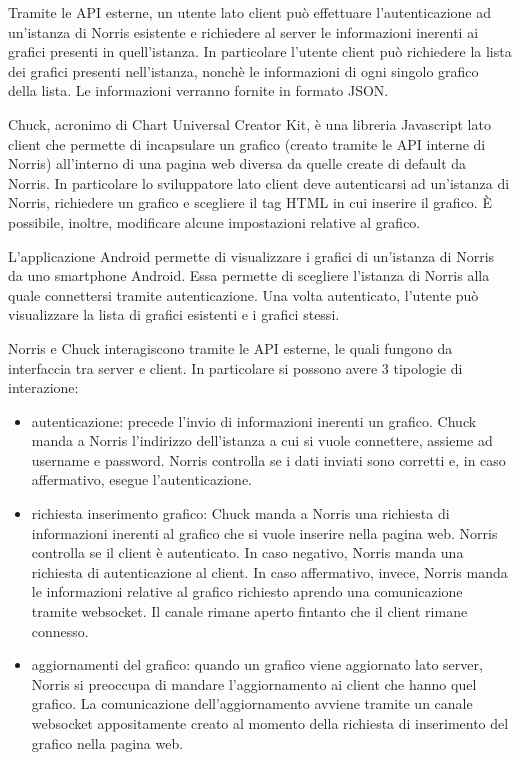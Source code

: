    Tramite le API esterne, un utente lato client può effettuare l'autenticazione ad un'istanza di Norris esistente e richiedere al server le informazioni inerenti ai grafici presenti in quell'istanza. In particolare l'utente client può richiedere la lista dei grafici presenti nell'istanza, nonchè le informazioni di ogni singolo grafico della lista. Le informazioni verranno fornite in formato JSON.

    Chuck, acronimo di Chart Universal Creator Kit, è una libreria Javascript lato client che permette di incapsulare un grafico (creato tramite le API interne di Norris) all'interno di una pagina web diversa da quelle create di default da Norris. In particolare lo sviluppatore lato client deve autenticarsi ad un'istanza di Norris, richiedere un grafico e scegliere il tag HTML in cui inserire il grafico. È possibile, inoltre, modificare alcune impostazioni relative al grafico.
    
    L'applicazione Android permette di visualizzare i grafici di un'istanza di Norris da uno smartphone Android. Essa permette di scegliere l'istanza di Norris alla quale connettersi tramite autenticazione. Una volta autenticato, l'utente può visualizzare la lista di grafici esistenti e i grafici stessi.
        
    Norris e Chuck interagiscono tramite le API esterne, le quali fungono da interfaccia tra server e client. In particolare si possono avere 3 tipologie di interazione:
    \begin{itemize}
        \item autenticazione: precede l'invio di informazioni inerenti un grafico. Chuck manda a Norris l'indirizzo dell'istanza a cui si vuole connettere, assieme ad username e password. Norris controlla se i dati inviati sono corretti e, in caso affermativo, esegue l'autenticazione.
        \item richiesta inserimento grafico: Chuck manda a Norris una richiesta di informazioni inerenti al grafico che si vuole inserire nella pagina web. Norris controlla se il client è autenticato. In caso negativo, Norris manda una richiesta di autenticazione al client. In caso affermativo, invece, Norris manda le informazioni relative al grafico richiesto aprendo una comunicazione tramite websocket. Il canale rimane aperto fintanto che il client rimane connesso.
        \item aggiornamenti del grafico: quando un grafico viene aggiornato lato server, Norris si preoccupa di mandare l'aggiornamento ai client che hanno quel grafico. La comunicazione dell'aggiornamento avviene tramite un canale websocket appositamente creato al momento della richiesta di inserimento del grafico nella pagina web.
    \end{itemize}
    
